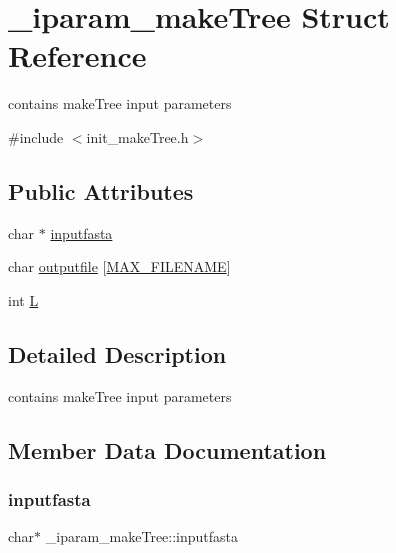 \hypertarget{struct__iparam__makeTree}{}\section{\+\_\+iparam\+\_\+make\+Tree Struct Reference}
\label{struct__iparam__makeTree}


contains make\+Tree input parameters  




{\ttfamily \#include $<$init\+\_\+make\+Tree.\+h$>$}

\subsection*{Public Attributes}
\begin{DoxyCompactItemize}
\item 
char $\ast$ \mbox{\hyperlink{struct__iparam__makeTree_a864d463534785b7f6cc7b9d52664b443}{inputfasta}}
\item 
char \mbox{\hyperlink{struct__iparam__makeTree_a9506dbea307f1fda5cc22c84bc4d035f}{outputfile}} \mbox{[}\mbox{\hyperlink{defines_8h_abe0ec333b60117063f9b9fd9f849cb08}{M\+A\+X\+\_\+\+F\+I\+L\+E\+N\+A\+ME}}\mbox{]}
\item 
int \mbox{\hyperlink{struct__iparam__makeTree_a56fd13b9cf051d4770f40b015a295fd3}{L}}
\end{DoxyCompactItemize}


\subsection{Detailed Description}
contains make\+Tree input parameters 

\subsection{Member Data Documentation}
\mbox{\label{struct__iparam__makeTree_a864d463534785b7f6cc7b9d52664b443}} 
\subsubsection{\texorpdfstring{inputfasta}{inputfasta}}
{\footnotesize\ttfamily char$\ast$ \+\_\+iparam\+\_\+make\+Tree\+::inputfasta}

